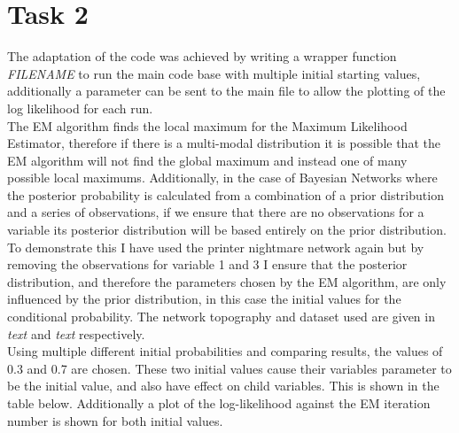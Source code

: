 \documentclass{article}
\begin{document}
\section{Task 2}
The adaptation of the code was achieved by writing a wrapper function \textit{FILENAME} to run the main code base with multiple initial starting values, additionally a parameter can be sent to the main file to allow the plotting of the log likelihood for each run. \\ 
The EM algorithm finds the local maximum for the Maximum Likelihood Estimator, therefore if there is a multi-modal distribution it is possible that the EM algorithm will not find the global maximum and instead one of many possible local maximums. Additionally, in the case of Bayesian Networks where the posterior probability is calculated from a combination of a prior distribution and a series of observations, if we ensure that there are no observations for a variable its posterior distribution will be based entirely on the prior distribution. To demonstrate this I have used the printer nightmare network again but by removing the observations for variable 1 and 3 I ensure that the posterior distribution, and therefore the parameters chosen by the EM algorithm, are only influenced by the prior distribution, in this case the initial values for the conditional probability. The network topography and dataset used are given in \textit{text} and \textit{text} respectively. \\
Using multiple different initial probabilities and comparing results, the values of 0.3 and 0.7 are chosen. These two initial values cause their variables parameter to be the initial value, and also have effect on child variables. This is shown in the table below. Additionally a plot of the log-likelihood against the EM iteration number is shown for both initial values.
\end{document}

